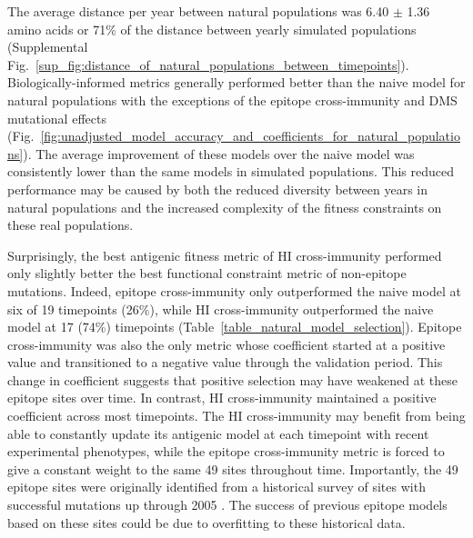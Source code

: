 The average distance per year between natural populations was 6.40 $\pm$ 1.36 amino acids or 71\% of the distance between yearly simulated populations (Supplemental Fig.~\ref{sup_fig:distance_of_natural_populations_between_timepoints}).
Biologically-informed metrics generally performed better than the naive model for natural populations with the exceptions of the epitope cross-immunity and DMS mutational effects (Fig.~\ref{fig:unadjusted_model_accuracy_and_coefficients_for_natural_populations}).
The average improvement of these models over the naive model was consistently lower than the same models in simulated populations.
This reduced performance may be caused by both the reduced diversity between years in natural populations and the increased complexity of the fitness constraints on these real populations.

Surprisingly, the best antigenic fitness metric of HI cross-immunity performed only slightly better the best functional constraint metric of non-epitope mutations.
Indeed, epitope cross-immunity only outperformed the naive model at six of 19 timepoints (26\%), while HI cross-immunity outperformed the naive model at 17 (74\%) timepoints (Table~\ref{table_natural_model_selection}).
Epitope cross-immunity was also the only metric whose coefficient started at a positive value and transitioned to a negative value through the validation period.
This change in coefficient suggests that positive selection may have weakened at these epitope sites over time.
In contrast, HI cross-immunity maintained a positive coefficient across most timepoints.
The HI cross-immunity may benefit from being able to constantly update its antigenic model at each timepoint with recent experimental phenotypes, while the epitope cross-immunity metric is forced to give a constant weight to the same 49 sites throughout time.
Importantly, the 49 epitope sites were originally identified from a historical survey of sites with successful mutations up through 2005 \cite{Shih:2007bd}.
The success of previous epitope models based on these sites could be due to overfitting to these historical data.

